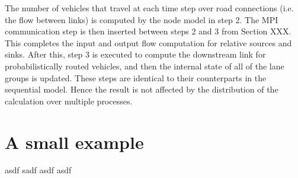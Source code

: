 The number of vehicles that travel at each time step over road connections (i.e. the flow between links) is computed by the node model in step 2. The MPI communication step is then inserted between steps 2 and 3 from Section XXX. This completes the input and output flow computation for relative sources and sinks. After this, step 3 is executed to compute the downstream link for probabilistically routed vehicles, and then the internal state of all of the lane groups is updated. These steps are identical to their counterparts in the sequential model. Hence the result is not affected by the distribution of the calculation over multiple processes.

\section{A small example}
asdf sadf asdf asdf 



